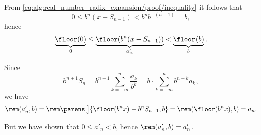 \begin{defproof}
\begin{itemize}
    From \eqref{eq:alg:real_number_radix_expansion/proof/inequality} it follows that
    \begin{equation*}
      0 \leq b^n (x - S_{n-1}) < b^n b^{-(n-1)} = b,
    \end{equation*}
    hence
    \begin{equation*}
      \underbrace{\floor(0)}_0 \leq \underbrace{\floor(b^n (x - S_{n-1}))}_{a_n'} < \underbrace{\floor(b)}_b.
    \end{equation*}
  \end{itemize}

   Since
  \begin{equation*}
    b^{n+1} S_n
    =
    b^{n+1} \sum_{k=-m}^n \frac {a_k} {b^k}
    =
    b \cdot \sum_{k=-m}^n b^{n-k} a_k,
  \end{equation*}
  we have
  \begin{equation*}
    \rem(a'_n, b)
    =
    \rem\parens[\big]{ \floor(b^n x) - b^n S_{n-1}, b }
    =
    \rem(\floor(b^n x), b)
    =
    a_n.
  \end{equation*}

  But we have shown that \( 0 \leq a'_n < b \), hence \( \rem(a'_n, b) = a'_n \).
\end{defproof}

